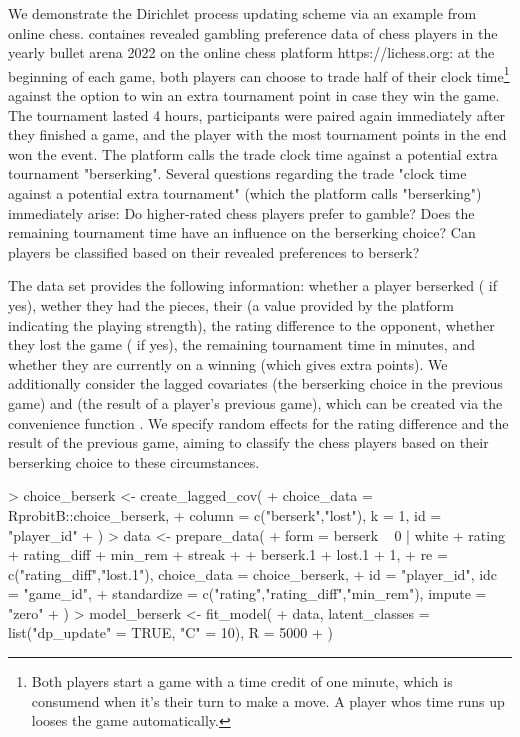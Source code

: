 \documentclass[article]{jss}
\newcommand{\fct}[1]{\code{#1()}}
\begin{document}
We demonstrate the Dirichlet process updating scheme via an example from online chess.  containes revealed gambling preference data of chess players in the yearly bullet arena 2022 on the online chess platform https://lichess.org: at the beginning of each game, both players can choose to trade half of their clock time\footnote{Both players start a game with a time credit of one minute, which is consumend when it's their turn to make a move. A player whos time runs up looses the game automatically.} against the option to win an extra tournament point in case they win the game. The tournament lasted 4 hours, participants were paired again immediately after they finished a game, and the player with the most tournament points in the end won the event. The platform calls the trade clock time against a potential extra tournament "berserking". Several questions regarding the trade "clock time against a potential extra tournament" (which the platform calls "berserking") immediately arise: Do higher-rated chess players prefer to gamble? Does the remaining tournament time have an influence on the berserking choice? Can players be classified based on their revealed preferences to berserk?

The  data set provides the following information: whether a player berserked ( if yes), wether they had the  pieces, their  (a value provided by the platform indicating the playing strength), the rating difference  to the opponent, whether they lost the game ( if yes), the remaining tournament time  in minutes, and whether they are currently on a winning  (which gives extra points). We additionally consider the lagged covariates  (the berserking choice in the previous game) and  (the result of a player's previous game), which can be created via the convenience function \fct{choice\_berserk}. We specify random effects for the rating difference and the result of the previous game, aiming to classify the chess players based on their berserking choice to these circumstances.

\begin{Schunk}
\begin{Sinput}
> choice_berserk <- create_lagged_cov(
+    choice_data = RprobitB::choice_berserk,
+    column = c("berserk","lost"), k = 1, id = "player_id"
+  )
> data <- prepare_data(
+    form = berserk ~ 0 | white + rating + rating_diff + min_rem + streak +
+      berserk.1 + lost.1 + 1,
+    re = c("rating_diff","lost.1"), choice_data = choice_berserk,
+    id = "player_id", idc = "game_id",
+    standardize = c("rating","rating_diff","min_rem"), impute = "zero"
+  )
> model_berserk <- fit_model(
+    data, latent_classes = list("dp_update" = TRUE, "C" = 10), R = 5000
+  )
\end{Sinput}
\end{Schunk}
\end{document}
